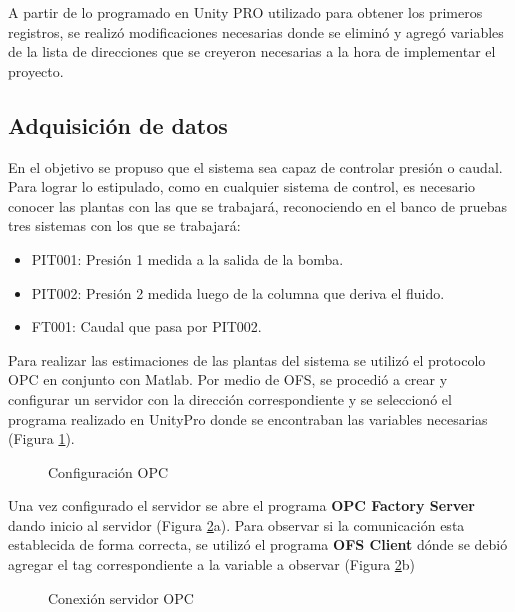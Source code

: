 
A partir de lo programado en Unity PRO utilizado para obtener los primeros registros, se realizó modificaciones necesarias donde se eliminó y agregó variables de la lista de direcciones que se creyeron necesarias a la hora de implementar el proyecto.\\

\subsection{Adquisición de datos}
En el objetivo se propuso que el sistema sea capaz de controlar presión o caudal. Para lograr lo estipulado, como en cualquier sistema de control, es necesario conocer las plantas con las que se trabajará, reconociendo en el banco de pruebas tres sistemas con los que se trabajará:
\begin{itemize}
	\item PIT001: Presión 1 medida a la salida de la bomba.
	\item PIT002: Presión 2 medida luego de la columna que deriva el fluido.
	\item FT001: Caudal que pasa por PIT002.
\end{itemize}
Para realizar las estimaciones de las plantas del sistema se utilizó el protocolo OPC en conjunto con Matlab. Por medio de OFS, se procedió a crear y configurar un servidor con la dirección correspondiente y se seleccionó el programa realizado en UnityPro donde se encontraban las variables necesarias (Figura \ref{fig:opc1}).

\begin{figure}[htbp]
	\centering
	\caption{Configuración OPC} \label{fig:opc1}
\end{figure}


Una vez configurado el servidor se abre el programa \textbf{OPC Factory Server} dando inicio al servidor (Figura \ref{fig:opc2}a). Para observar si la comunicación esta establecida de forma correcta, se utilizó el programa \textbf{OFS Client} dónde se debió agregar el tag correspondiente a la variable a observar (Figura \ref{fig:opc2}b)

\begin{figure}[htbp]
	\centering
	\caption{Conexión servidor OPC} \label{fig:opc2}
\end{figure}

